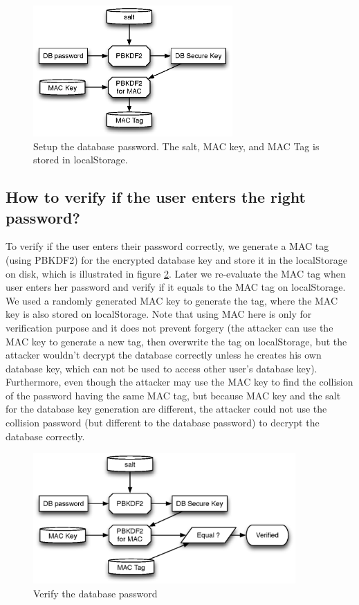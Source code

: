 \begin{figure}[h!]
\centering
\caption{Setup the database password. The salt, MAC key, and MAC Tag is stored in localStorage.}
\label{fig:dbkeys}
\includegraphics[height=5cm]{fig/dbkeys.eps}
\end{figure}

\subsection{How to verify if the user enters the right password?}
\label{sec:verify}
To verify if the user enters their password correctly, we generate a MAC tag (using PBKDF2) for the encrypted database key and store it in the localStorage on disk, which is illustrated in figure \ref{fig:verify_dbkeys}. Later we re-evaluate the MAC tag when user enters her password and verify if it equals to the MAC tag on localStorage. We used a randomly generated MAC key to generate the tag, where the MAC key is also stored on localStorage. Note that using MAC here is only for verification purpose and it does not prevent forgery (the attacker can use the MAC key to generate a new tag, then overwrite the tag on localStorage, but the attacker wouldn't decrypt the database correctly unless he creates his own database key, which can not be used to access other user's database key). Furthermore, even though the attacker may use the MAC key to find the collision of the password having the same MAC tag, but because MAC key and the salt for the database key generation are different, the attacker could not use the collision password (but different to the database password) to decrypt the database correctly. 
\begin{figure}[h!]
\centering
\caption{Verify the database password}
\label{fig:verify_dbkeys}
\includegraphics[height=5cm]{fig/verify_dbkeys.eps}
\end{figure}

